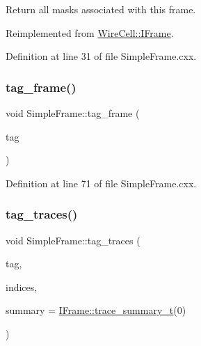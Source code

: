Return all masks associated with this frame. 



Reimplemented from \hyperlink{class_wire_cell_1_1_i_frame_a577dd9839b5239799ee8c8e508b3a9e4}{Wire\+Cell\+::\+I\+Frame}.



Definition at line 31 of file Simple\+Frame.\+cxx.

\mbox{\label{class_wire_cell_1_1_simple_frame_aaa71e980a3b4467a9ed05af3e5f45f03}} 
\subsubsection{\texorpdfstring{tag\+\_\+frame()}{tag\_frame()}}
{\footnotesize\ttfamily void Simple\+Frame\+::tag\+\_\+frame (\begin{DoxyParamCaption}\item[{const \hyperlink{class_wire_cell_1_1_i_frame_ae206ba618e10f398625dfeb675a4215a}{tag\+\_\+t} \&}]{tag }\end{DoxyParamCaption})}



Definition at line 71 of file Simple\+Frame.\+cxx.

\mbox{\label{class_wire_cell_1_1_simple_frame_a106f413268020b6ea2a87364089bd65c}} 
\subsubsection{\texorpdfstring{tag\+\_\+traces()}{tag\_traces()}}
{\footnotesize\ttfamily void Simple\+Frame\+::tag\+\_\+traces (\begin{DoxyParamCaption}\item[{const \hyperlink{class_wire_cell_1_1_i_frame_ae206ba618e10f398625dfeb675a4215a}{tag\+\_\+t} \&}]{tag,  }\item[{const \hyperlink{class_wire_cell_1_1_i_frame_a12f08adf79d21cb9b4862a16193fda8f}{I\+Frame\+::trace\+\_\+list\+\_\+t} \&}]{indices,  }\item[{const \hyperlink{class_wire_cell_1_1_i_frame_ad65f8b090c2607591e44d7b40777517e}{I\+Frame\+::trace\+\_\+summary\+\_\+t} \&}]{summary = {\ttfamily \hyperlink{class_wire_cell_1_1_i_frame_ad65f8b090c2607591e44d7b40777517e}{I\+Frame\+::trace\+\_\+summary\+\_\+t}(0)} }\end{DoxyParamCaption})}



